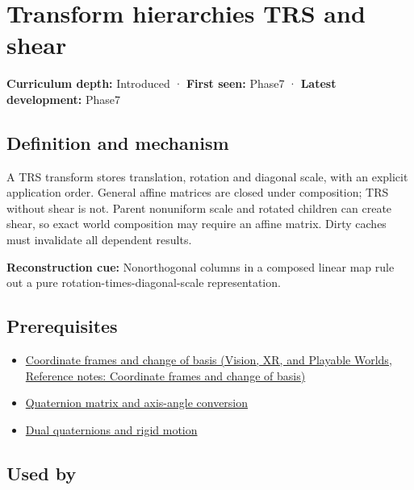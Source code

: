 \hypertarget{appendix-292c061cd47c}{}\label{referencestart:appendix-292c061cd47c}
\section{Transform hierarchies TRS and shear}\label{appendix-292c061cd47c-transform-hierarchies-trs-and-shear}

\textbf{Curriculum depth:} Introduced · \textbf{First seen:} Phase7 · \textbf{Latest development:} Phase7

\subsection{Definition and mechanism}\label{appendix-292c061cd47c-definition-and-mechanism}

A TRS transform stores translation, rotation and diagonal scale, with an explicit application order. General affine matrices are closed under composition; TRS without shear is not. Parent nonuniform scale and rotated children can create shear, so exact world composition may require an affine matrix. Dirty caches must invalidate all dependent results.

\textbf{Reconstruction cue:} Nonorthogonal columns in a composed linear map rule out a pure rotation-times-diagonal-scale representation.

\subsection{Prerequisites}\label{appendix-292c061cd47c-prerequisites}

\begin{itemize}
\tightlist
\item
  \href{../07-Vision-XR-and-Playable-Worlds/main.pdf\#nameddest=appendix-1bae9457dbc3}{Coordinate frames and change of basis (Vision, XR, and Playable Worlds, Reference notes: Coordinate frames and change of basis)}
\item
  \hyperref[appendix-26d8da71f6c4]{Quaternion matrix and axis-angle conversion}
\item
  \hyperref[appendix-d1ea57347893]{Dual quaternions and rigid motion}
\end{itemize}

\subsection{Used by}\label{appendix-292c061cd47c-used-by}

